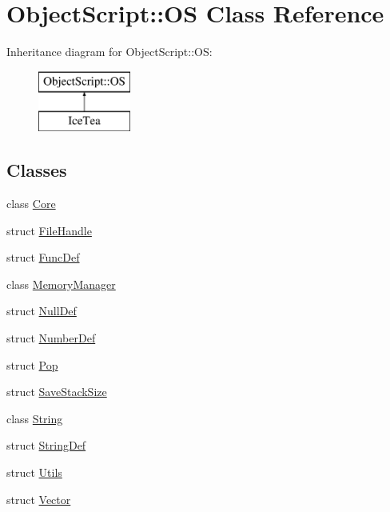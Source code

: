 \hypertarget{class_object_script_1_1_o_s}{}\section{Object\+Script\+:\+:OS Class Reference}
\label{class_object_script_1_1_o_s}
Inheritance diagram for Object\+Script\+:\+:OS\+:\begin{figure}[H]
\begin{center}
\leavevmode
\includegraphics[height=2.000000cm]{class_object_script_1_1_o_s}
\end{center}
\end{figure}
\subsection*{Classes}
\begin{DoxyCompactItemize}
\item 
class \hyperlink{class_object_script_1_1_o_s_1_1_core}{Core}
\item 
struct \hyperlink{struct_object_script_1_1_o_s_1_1_file_handle}{File\+Handle}
\item 
struct \hyperlink{struct_object_script_1_1_o_s_1_1_func_def}{Func\+Def}
\item 
class \hyperlink{class_object_script_1_1_o_s_1_1_memory_manager}{Memory\+Manager}
\item 
struct \hyperlink{struct_object_script_1_1_o_s_1_1_null_def}{Null\+Def}
\item 
struct \hyperlink{struct_object_script_1_1_o_s_1_1_number_def}{Number\+Def}
\item 
struct \hyperlink{struct_object_script_1_1_o_s_1_1_pop}{Pop}
\item 
struct \hyperlink{struct_object_script_1_1_o_s_1_1_save_stack_size}{Save\+Stack\+Size}
\item 
class \hyperlink{class_object_script_1_1_o_s_1_1_string}{String}
\item 
struct \hyperlink{struct_object_script_1_1_o_s_1_1_string_def}{String\+Def}
\item 
struct \hyperlink{struct_object_script_1_1_o_s_1_1_utils}{Utils}
\item 
struct \hyperlink{struct_object_script_1_1_o_s_1_1_vector}{Vector}
\end{DoxyCompactItemize}
